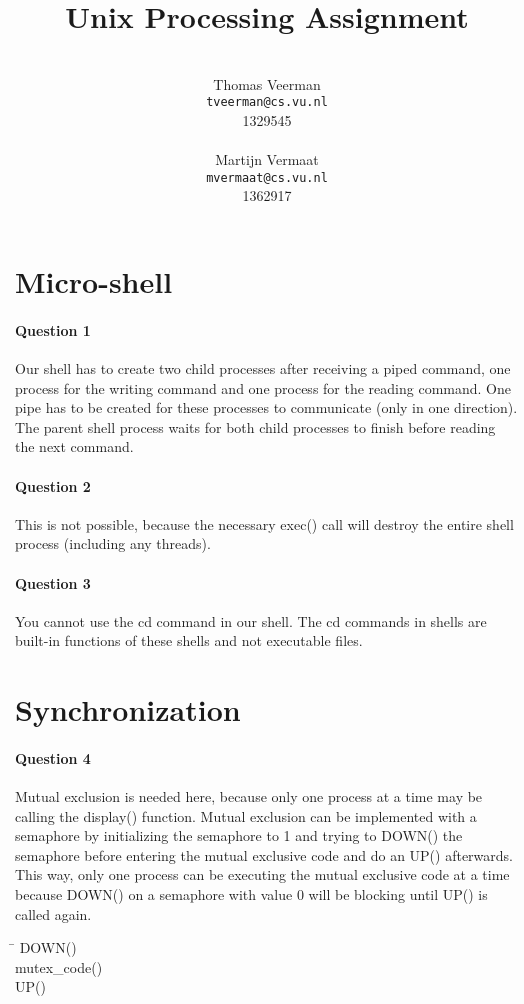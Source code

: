 \documentclass[a4paper,10pt]{article}
\title{Unix Processing Assignment}
\author{%
        \mbox{}\\
	Thomas Veerman\\
	\texttt{tveerman@cs.vu.nl}\\
	1329545\\
	\mbox{}\\
	Martijn Vermaat\\
	\texttt{mvermaat@cs.vu.nl}\\
	1362917
}
\begin{document}
\maketitle

\section{Micro-shell}
\paragraph{Question 1}
Our shell has to create two child processes after receiving a piped command, one process for the writing command and one process for the reading command. One pipe has to be created for these processes to communicate (only in one direction). The parent shell process waits for both child processes to finish before reading the next command.

\paragraph{Question 2}
This is not possible, because the necessary exec() call will destroy the entire shell process (including any threads).

\paragraph{Question 3}
You cannot use the cd command in our shell. The cd commands in shells are built-in functions of these shells and not executable files.

\section{Synchronization}
\paragraph{Question 4}
Mutual exclusion is needed here, because only one process at a time may be calling the display() function. Mutual exclusion can be implemented with a semaphore by initializing the semaphore to 1 and trying to DOWN() the semaphore before entering the mutual exclusive code and do an UP() afterwards. This way, only one process can be executing the mutual exclusive code at a
time because DOWN() on a semaphore with value 0 will be blocking until UP() is called again.
\begin{tabbing}
\hspace{20pt}\=\kill
 \> DOWN()\\ 
 \> mutex\_code()\\ 
 \> UP() 
\end{tabbing}
\end{document}
